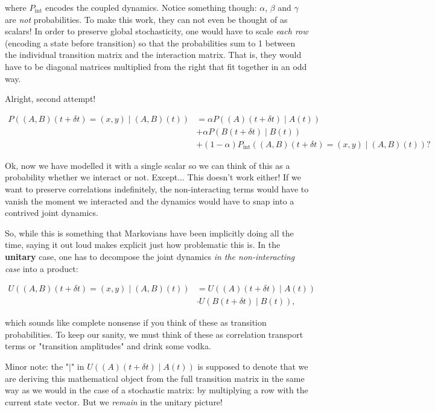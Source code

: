 \documentclass{article}
\begin{document}
where $P_{\text{int}}$ encodes the coupled dynamics. Notice something though: $\alpha$, $\beta$ and $\gamma$ are \textit{not} probabilities. To make this work, they can not even be thought of as scalars! In order to preserve global stochasticity, one would have to scale \textit{each row} (encoding a state before transition) so that the probabilities sum to 1 between the individual transition matrix and the interaction matrix. That is, they would have to be diagonal matrices multiplied from the right that fit together in an odd way.

Alright, second attempt!

\begin{align*}
 P((A,B)(t+\delta t) = (x,y)\mid (A,B)(t)) &= \alpha P((A)(t + \delta t)\mid A(t))\\ & + \alpha P(B(t+\delta t) \mid B(t)) \\ & + (1-\alpha) P_{\text{int}}((A,B)(t+\delta t) = (x,y)\mid (A,B)(t))? 
\end{align*}

Ok, now we have modelled it with a single scalar so we can think of this as a probability whether we interact or not. Except... This doesn't work either! If we want to preserve correlations indefinitely, the non-interacting terms would have to vanish the moment we interacted and the dynamics would have to snap into a contrived joint dynamics.

So, while this is something that Markovians have been implicitly doing all the time, saying it out loud makes explicit just how problematic this is.
In the \textbf{unitary} case, one has to decompose the joint dynamics \textit{in the non-interacting case} into a product:

\begin{align*}
 U((A,B)(t+\delta t) = (x,y)\mid (A,B)(t)) &= U((A)(t + \delta t)\mid A(t))\\ & \cdot U(B(t+\delta t) \mid B(t)),
\end{align*}

which sounds like complete nonsense if you think of these as transition probabilities. To keep our sanity, we must think of these as correlation transport terms or "transition amplitudes" and drink some vodka.

Minor note: the "$\mid$" in $U((A)(t + \delta t)\mid A(t))$ is supposed to denote that we are deriving this mathematical object from the full transition matrix in the same way as we would in the case of a stochastic matrix: by multiplying a row with the current state vector. But we \textit{remain} in the unitary picture!
\end{document}
